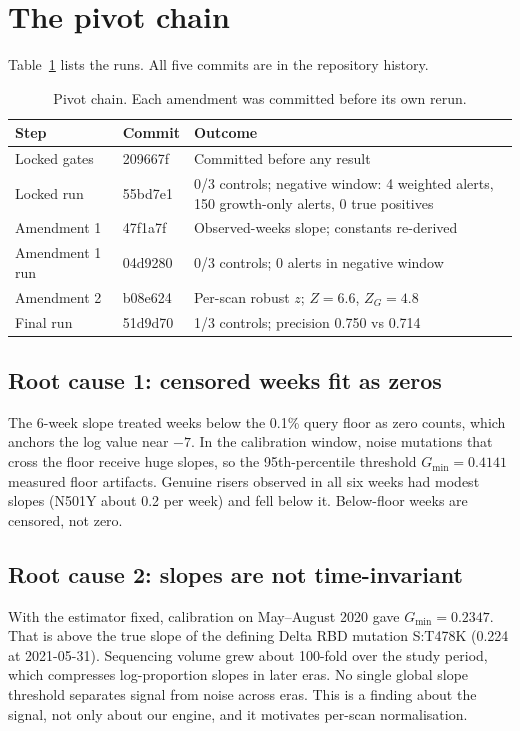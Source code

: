\documentclass[11pt]{article}
\newcommand{\toprule}{\hline}\newcommand{\midrule}{\hline}\newcommand{\bottomrule}{\hline}
\begin{document}
\section{The pivot chain}\label{sec:pivots}
Table~\ref{tab:pivots} lists the runs. All five commits are in the repository history.
\begin{table}[h]\centering\small
\begin{tabular}{llp{6.2cm}}\toprule
Step & Commit & Outcome\\\midrule
Locked gates & 209667f & Committed before any result\\
Locked run & 55bd7e1 & 0/3 controls; negative window: 4 weighted alerts, 150 growth-only alerts, 0 true positives\\
Amendment 1 & 47f1a7f & Observed-weeks slope; constants re-derived\\
Amendment 1 run & 04d9280 & 0/3 controls; 0 alerts in negative window\\
Amendment 2 & b08e624 & Per-scan robust $z$; $Z=6.6$, $Z_G=4.8$\\
Final run & 51d9d70 & 1/3 controls; precision 0.750 vs 0.714\\\bottomrule
\end{tabular}\caption{Pivot chain. Each amendment was committed before its own rerun.}\label{tab:pivots}
\end{table}

\subsection{Root cause 1: censored weeks fit as zeros}
The 6-week slope treated weeks below the 0.1\% query floor as zero counts, which anchors the log value near $-7$. In the calibration window, noise mutations that cross the floor receive huge slopes, so the 95th-percentile threshold $G_{\min}=0.4141$ measured floor artifacts. Genuine risers observed in all six weeks had modest slopes (N501Y about 0.2 per week) and fell below it. Below-floor weeks are censored, not zero.

\subsection{Root cause 2: slopes are not time-invariant}
With the estimator fixed, calibration on May--August 2020 gave $G_{\min}=0.2347$. That is above the true slope of the defining Delta RBD mutation S:T478K (0.224 at 2021-05-31). Sequencing volume grew about 100-fold over the study period, which compresses log-proportion slopes in later eras. No single global slope threshold separates signal from noise across eras. This is a finding about the signal, not only about our engine, and it motivates per-scan normalisation.
\end{document}
